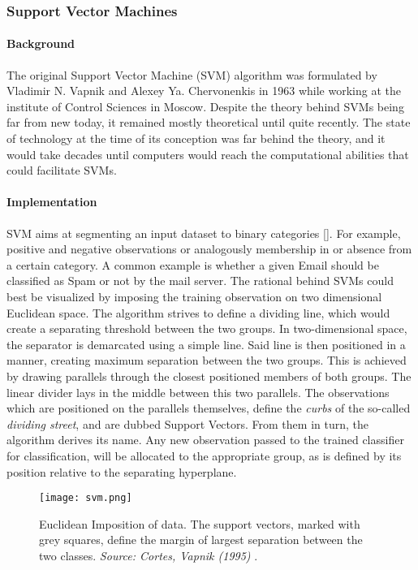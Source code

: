 \subsubsection{Support Vector Machines}
	
	\paragraph{Background}
	The original Support Vector Machine (SVM) algorithm was formulated by Vladimir N. Vapnik and Alexey Ya. Chervonenkis in 1963 while working at the institute of Control Sciences in Moscow. Despite the theory behind SVMs being far from new today, it remained mostly theoretical until quite recently. The state of technology at the time of its conception was far behind the theory, and it would take decades until computers would reach the computational abilities that could facilitate SVMs.
	
	\paragraph{Implementation}
	SVM aims at segmenting an input dataset to binary categories [\cite{SVM_burges1998tutorial}]. For example, positive and negative observations or analogously membership in or absence from a certain category. A common example is whether a given Email should be classified as Spam or not by the mail server. The rational behind SVMs could best be visualized by imposing the training observation on two dimensional Euclidean space. The algorithm strives to define a dividing line, which would create a separating threshold between the two groups. In two-dimensional space, the separator is demarcated using a simple line. Said line is then positioned in a manner, creating maximum separation between the two groups. This is achieved by drawing parallels through the closest positioned members of both groups. The linear divider lays in the middle between this two parallels. The observations which are positioned on the parallels themselves, define the \textit{curbs} of the so-called \textit{dividing street}, and are dubbed Support Vectors. From them in turn, the algorithm derives its name. Any new observation passed to the trained classifier for classification, will be allocated to the appropriate group, as is defined by its position relative to the separating hyperplane. 
	
	\begin{figure}[h]
		\centering
		\captionsetup{width=0.8\textwidth}
		\texttt{[image: svm.png]}
		\caption[SVM in Euclidean Space]{
			\footnotesize{
				Euclidean Imposition of data. The support vectors, marked with grey squares, define the margin of largest separation between the two classes. \textit{Source: Cortes, Vapnik (1995)} \cite{SVM_cortes1995support}.
			}
		} 
	\end{figure}

